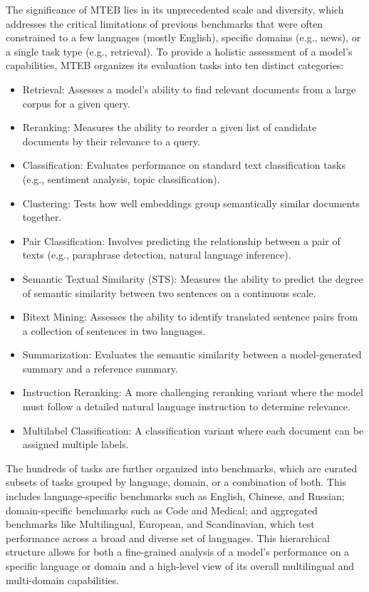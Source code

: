 The significance of MTEB lies in its unprecedented scale and diversity, which addresses the critical limitations of previous benchmarks that were often constrained to a few languages (mostly English), specific domains (e.g., news), or a single task type (e.g., retrieval). To provide a holistic assessment of a model's capabilities, MTEB organizes its evaluation tasks into ten distinct categories:
\begin{itemize}
    \item Retrieval: Assesses a model's ability to find relevant documents from a large corpus for a given query.
    \item Reranking: Measures the ability to reorder a given list of candidate documents by their relevance to a query.
    \item Classification: Evaluates performance on standard text classification tasks (e.g., sentiment analysis, topic classification).
    \item Clustering: Tests how well embeddings group semantically similar documents together.
    \item Pair Classification: Involves predicting the relationship between a pair of texts (e.g., paraphrase detection, natural language inference).
    \item Semantic Textual Similarity (STS): Measures the ability to predict the degree of semantic similarity between two sentences on a continuous scale.
    \item Bitext Mining: Assesses the ability to identify translated sentence pairs from a collection of sentences in two languages.
    \item Summarization: Evaluates the semantic similarity between a model-generated summary and a reference summary.
    \item Instruction Reranking: A more challenging reranking variant where the model must follow a detailed natural language instruction to determine relevance.
    \item Multilabel Classification: A classification variant where each document can be assigned multiple labels.
\end{itemize}

The hundreds of tasks are further organized into benchmarks, which are curated subsets of tasks grouped by language, domain, or a combination of both. This includes language-specific benchmarks such as English, Chinese, and Russian; domain-specific benchmarks such as Code and Medical; and aggregated benchmarks like Multilingual, European, and Scandinavian, which test performance across a broad and diverse set of languages. This hierarchical structure allows for both a fine-grained analysis of a model's performance on a specific language or domain and a high-level view of its overall multilingual and multi-domain capabilities.

